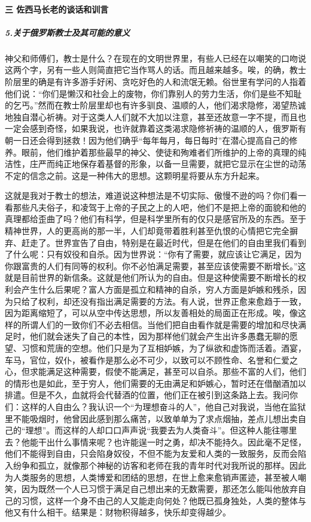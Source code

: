 \paragraph*{三 佐西马长老的谈话和训言}
\subparagraph*{5.关于俄罗斯教士及其可能的意义}
\par 神父和师傅们，教士是什么？在现在的文明世界里，有些人已经在以嘲笑的口吻说这两个字，另有一些人则简直把它当作骂人的话。而且越来越多。唉，的确，教士阶层里的确是有许多游手好闲、贪吃好色的人和流氓无赖。俗世里有学问的人指着他们说：“你们是懒汉和社会上的废物，你们靠别人的劳力生活，你们是些不知耻的乞丐。”然而在教士阶层里却也有许多驯良、温顺的人，他们渴求隐修，渴望热诚地独自潜心祈祷。对于这类人人们就不大加以注意，甚至还故意一字不提，而且也一定会感到奇怪，如果我说，也许就靠着这类渴求隐修祈祷的温顺的人，俄罗斯有朝一日还会得到拯救！因为他们确乎“每年每月，每日每时”在潜心提高自己的修养。眼前，他们维护着那些最早的神父、使徒和殉难者们所维护的上帝的真理的纯洁性，庄严而纯正地保存着基督的形象，以备一旦需要，就把它显示在尘世的动荡不定的信念之前。这是一种伟大的思想。这颗明星将要从东方升起来。
\par 这就是我对于教士的想法，难道说这种想法是不切实际、傲慢不逊的吗？你们看一看那些凡夫俗子，和凌驾于上帝的子民之上的人吧，他们不是把上帝的面貌和他的真理都给歪曲了吗？他们有科学，但是科学里所有的仅只是感官所及的东西。至于精神世界，人的更高尚的那一半，人们却竟带着胜利甚至仇恨的心情把它完全摒弃、赶走了。世界宣告了自由，特别是在最近时代，但是在他们的自由里我们看到了什么呢：只有奴役和自杀。因为世界说：“你有了需要，就应该让它满足，因为你跟富贵的人们有同等的权利。你不必怕满足需要，甚至应该使需要不断增长。”这就是目前世界的新信条。这就是他们所认为的自由。但是这种使需要不断增长的权利会产生什么后果呢？富人方面是孤立和精神的自杀，穷人方面是妒嫉和残杀，因为只给了权利，却还没有指出满足需要的方法。有人说，世界正愈来愈趋于一致，因为距离缩短了，可以从空中传达思想，所以友善相处的局面正在形成。唉，像这样的所谓人们的一致你们不必去相信。当他们把自由看作就是需要的增加和尽快满足时，他们就会迷失了自己的本性，因为那样他们就会产生出许多愚蠢无聊的愿望、习惯和荒唐的空想。他们只是为了互相妒嫉，为了纵欲和虚饰而活着。酒宴，车马，官位，奴仆，被看作是那么必不可少，以致可以不顾性命、名誉和仁爱之心，但求能满足这种需要，假使不能满足，甚至可以自杀。那些不富的人们，他们的情形也是如此，至于穷人，他们需要的无由满足和妒嫉心，暂时还在借酗酒加以排遣。但是不久，血就将会代替酒的位置，他们正在被引到这条路上去。我问你们：这样的人自由么？我认识一个“为理想奋斗的人”，他自己对我说，当他在监狱里不能吸烟时，他曾因此感到那么痛苦，以致单单为了求点烟抽，差点儿想出卖自己的“理想”。而这样的人却口口声声说“我要去为人类奋斗”。但这种人能往哪里去？他能干出什么事情来呢？也许能逞一时之勇，却决不能持久。因此毫不足怪，他们不能得到自由，只会陷身奴役，不但不能为友爱和人类的一致服务，反而会陷入纷争和孤立，就像那个神秘的访客和老师在我的青年时代对我所说的那样。因此为人类服务的思想，人类博爱和团结的思想，在世上愈来愈销声匿迹，甚至被人嘲笑，因为既然一个人已习惯于满足自己想出来的无数需要，那还怎么能叫他放弃自己的习惯，这样一个身不由己的人又能走向何处？他既已孤身独处，人类的整体与他又有什么相干。结果是：财物积得越多，快乐却变得越少。
